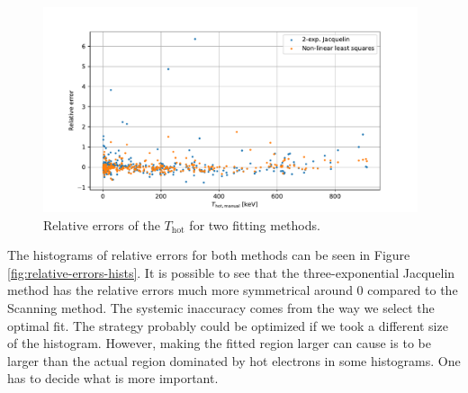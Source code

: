\begin{figure}[t]
	\centering
	\includegraphics[width=0.98\textwidth]{figures/relative-error}
	\caption{Relative errors of the $T_\mathrm{hot}$ for two fitting methods.}
	\label{fig:relative-errors}
\end{figure}

The histograms of relative errors for both methods can be seen in Figure \ref{fig:relative-errors-hists}. It is possible to see that the three-exponential Jacquelin method has the relative errors much more symmetrical around 0 compared to the Scanning method. The systemic inaccuracy comes from the way we select the optimal fit. The strategy probably could be optimized if we took a different size of the histogram. However, making the fitted region larger can cause is to be larger than the actual region dominated by hot electrons in some histograms. One has to decide what is more important.

